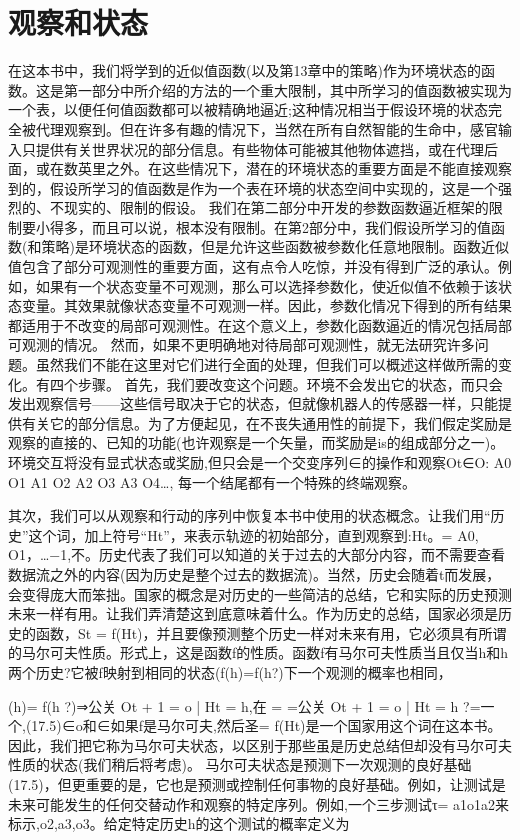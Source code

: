 \section{观察和状态}

在这本书中，我们将学到的近似值函数(以及第13章中的策略)作为环境状态的函数。这是第一部分中所介绍的方法的一个重大限制，其中所学习的值函数被实现为一个表，以便任何值函数都可以被精确地逼近;这种情况相当于假设环境的状态完全被代理观察到。但在许多有趣的情况下，当然在所有自然智能的生命中，感官输入只提供有关世界状况的部分信息。有些物体可能被其他物体遮挡，或在代理后面，或在数英里之外。在这些情况下，潜在的环境状态的重要方面是不能直接观察到的，假设所学习的值函数是作为一个表在环境的状态空间中实现的，这是一个强烈的、不现实的、限制的假设。
我们在第二部分中开发的参数函数逼近框架的限制要小得多，而且可以说，根本没有限制。在第2部分中，我们假设所学习的值函数(和策略)是环境状态的函数，但是允许这些函数被参数化任意地限制。函数近似值包含了部分可观测性的重要方面，这有点令人吃惊，并没有得到广泛的承认。例如，如果有一个状态变量不可观测，那么可以选择参数化，使近似值不依赖于该状态变量。其效果就像状态变量不可观测一样。因此，参数化情况下得到的所有结果都适用于不改变的局部可观测性。在这个意义上，参数化函数逼近的情况包括局部可观测的情况。
然而，如果不更明确地对待局部可观测性，就无法研究许多问题。虽然我们不能在这里对它们进行全面的处理，但我们可以概述这样做所需的变化。有四个步骤。
首先，我们要改变这个问题。环境不会发出它的状态，而只会发出观察信号——这些信号取决于它的状态，但就像机器人的传感器一样，只能提供有关它的部分信息。为了方便起见，在不丧失通用性的前提下，我们假定奖励是观察的直接的、已知的功能(也许观察是一个矢量，而奖励是is的组成部分之一)。环境交互将没有显式状态或奖励,但只会是一个交变序列∈的操作和观察Ot∈O:
A0 O1 A1 O2 A2 O3 A3 O4…,
每一个结尾都有一个特殊的终端观察。

其次，我们可以从观察和行动的序列中恢复本书中使用的状态概念。让我们用“历史”这个词，加上符号“Ht”，来表示轨迹的初始部分，直到观察到:Ht。= A0, O1，…−1,不。历史代表了我们可以知道的关于过去的大部分内容，而不需要查看数据流之外的内容(因为历史是整个过去的数据流)。当然，历史会随着t而发展，会变得庞大而笨拙。国家的概念是对历史的一些简洁的总结，它和实际的历史预测未来一样有用。让我们弄清楚这到底意味着什么。作为历史的总结，国家必须是历史的函数，St = f(Ht)，并且要像预测整个历史一样对未来有用，它必须具有所谓的马尔可夫性质。形式上，这是函数f的性质。函数f有马尔可夫性质当且仅当h和h两个历史?它被f映射到相同的状态(f(h)=f(h?)下一个观测的概率也相同，

(h)= f(h ?)⇒公关{ Ot + 1 = o | Ht = h,在} = =公关{ Ot + 1 = o | Ht = h ?=一个},(17.5)∈o和∈如果f是马尔可夫,然后圣= f(Ht)是一个国家用这个词在这本书。因此，我们把它称为马尔可夫状态，以区别于那些虽是历史总结但却没有马尔可夫性质的状态(我们稍后将考虑)。
马尔可夫状态是预测下一次观测的良好基础(17.5)，但更重要的是，它也是预测或控制任何事物的良好基础。例如，让测试是未来可能发生的任何交替动作和观察的特定序列。例如,一个三步测试τ= a1o1a2来标示,o2,a3,o3。给定特定历史h的这个测试的概率定义为

